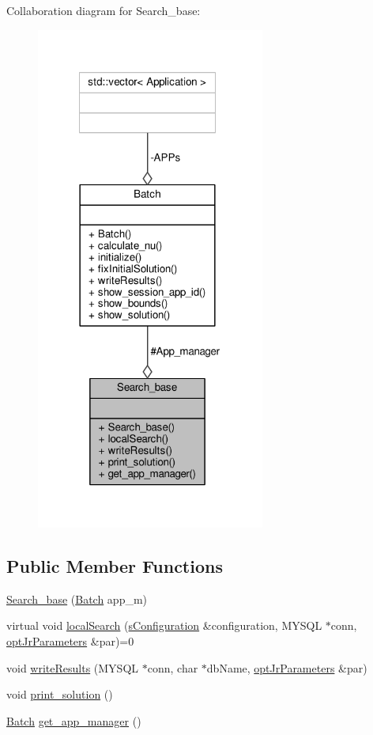 Collaboration diagram for Search\-\_\-base\-:\nopagebreak
\begin{figure}[H]
\begin{center}
\leavevmode
\includegraphics[width=213pt]{classSearch__base__coll__graph}
\end{center}
\end{figure}
\subsection*{Public Member Functions}
\begin{DoxyCompactItemize}
\item 
\hyperlink{classSearch__base_a222697de87f38891f9018defe1988dc4}{Search\-\_\-base} (\hyperlink{classBatch}{Batch} app\-\_\-m)
\item 
virtual void \hyperlink{classSearch__base_aa8817b112abf47a39909017933c92cbf}{local\-Search} (\hyperlink{readConfigurationFile_8hh_ab8f35b1da3261263c5e9c0e7c8921f5c}{s\-Configuration} \&configuration, M\-Y\-S\-Q\-L $\ast$conn, \hyperlink{classoptJrParameters}{opt\-Jr\-Parameters} \&par)=0
\item 
void \hyperlink{classSearch__base_af6ff26051c64a540002219b5753b7177}{write\-Results} (M\-Y\-S\-Q\-L $\ast$conn, char $\ast$db\-Name, \hyperlink{classoptJrParameters}{opt\-Jr\-Parameters} \&par)
\item 
void \hyperlink{classSearch__base_a6380bc5489f95cf722fa7cc329dc9f9d}{print\-\_\-solution} ()
\item 
\hyperlink{classBatch}{Batch} \hyperlink{classSearch__base_a10a67e4278d8281e4db740924a2bd658}{get\-\_\-app\-\_\-manager} ()
\end{DoxyCompactItemize}
